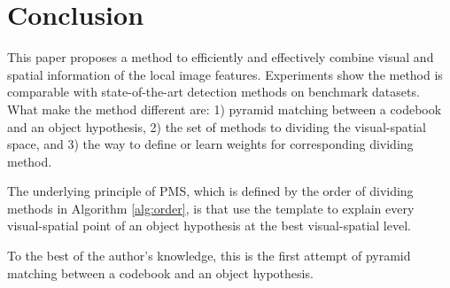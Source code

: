 \documentclass[paper]{ieice}
\begin{document}
\section{Conclusion}
\label{conc5}
This paper proposes a method to efficiently and effectively combine visual and spatial information of the local image features. Experiments show the method is comparable with state-of-the-art detection methods on benchmark datasets. What make the method different are: 1) pyramid matching between a codebook and an  object hypothesis, 2) the set of methods to dividing the visual-spatial space, and 3) the way to define or learn weights for corresponding dividing method.

The underlying principle of PMS, which is defined by the order of dividing methods in Algorithm \ref{alg:order}, is that use the template to explain every visual-spatial point of an object hypothesis at the best visual-spatial level.

To the best of the author's knowledge, this is the first attempt of pyramid matching between a codebook and an object hypothesis.





\end{document}
